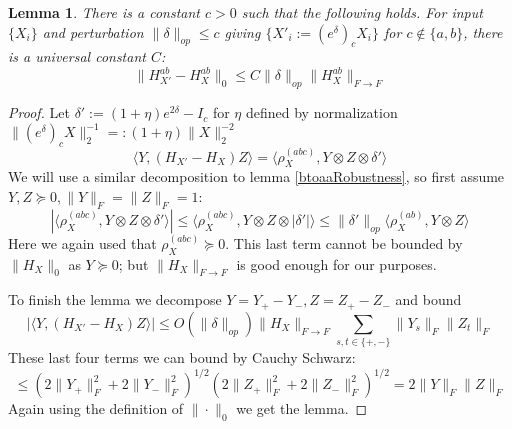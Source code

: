 \documentclass{article}
\newtheorem{lemma}[theorem]{Lemma}
\begin{document}
\begin{lemma} \label{ctoabRobustness}
There is a constant $c>0$ such that the following holds. For input $\{X_{i}\}$ and perturbation $\|\delta\|_{op} \leq c$ giving $\{X'_{i} := (e^{\delta})_{c} X_{i} \}$ for $c \not\in \{a,b\}$, there is a universal constant $C$:
\[ \|H_{X'}^{ab} - H_{X}^{ab}\|_{0} \leq C \|\delta\|_{op} \|H_{X}^{ab}\|_{F \to F}    \]
\end{lemma}
\begin{proof}
Let $\delta' := (1+\eta) e^{2 \delta} - I_{c}$ for $\eta$ defined by normalization $\|(e^{\delta})_{c} X\|_{2}^{-1} =: (1+\eta) \|X\|_{2}^{-2}$
\[ \langle Y, (H_{X'} - H_{X}) Z \rangle = \langle \rho_{X}^{(abc)}, Y \otimes Z \otimes \delta' \rangle   \]
We will use a similar decomposition to lemma \ref{btoaaRobustness}, so first assume $Y,Z \succeq 0, \|Y\|_{F} = \|Z\|_{F} = 1$:
\[ |\langle \rho_{X}^{(abc)}, Y \otimes Z \otimes \delta' \rangle| \leq \langle \rho_{X}^{(abc)}, Y \otimes Z \otimes |\delta'| \rangle \leq \|\delta'\|_{op} \langle \rho_{X}^{(ab)}, Y \otimes Z \rangle   \]
Here we again used that $\rho_{X}^{(abc)} \succeq 0$. This last term cannot be bounded by $\|H_{X}\|_{0}$ as $Y \succeq 0$; but $\|H_{X}\|_{F \to F}$ is good enough for our purposes. 

To finish the lemma we decompose $Y = Y_{+} - Y_{-}, Z = Z_{+} - Z_{-}$ and bound
\[ |\langle Y, (H_{X'} - H_{X}) Z \rangle| \leq O(\|\delta\|_{op}) \|H_{X}\|_{F \to F} \sum_{s,t \in \{+,-\}} \|Y_{s}\|_{F} \|Z_{t}\|_{F}   \]
These last four terms we can bound by Cauchy Schwarz:
\[ \leq (2\|Y_{+}\|_{F}^{2} + 2\|Y_{-}\|_{F}^{2})^{1/2} (2\|Z_{+}\|_{F}^{2} + 2\|Z_{-}\|_{F}^{2})^{1/2} = 2 \|Y\|_{F} \|Z\|_{F}     \]
Again using the definition of $\|\cdot\|_{0}$ we get the lemma. 
\end{proof}
\end{document}
